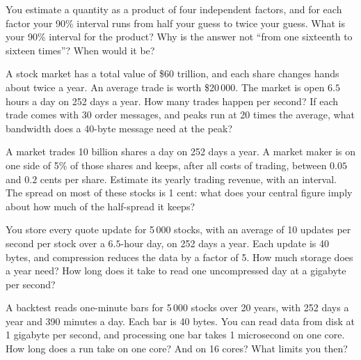 \begin{question}\label{iq:iv1:estimation:12}
You estimate a quantity as a product of four independent factors, and for each factor your 90\% interval runs from half your guess to twice your guess. What is your 90\% interval for the product? Why is the answer not ``from one sixteenth to sixteen times''? When would it be?
\end{question}

\begin{question}\label{iq:iv1:estimation:13}
A stock market has a total value of \$60 trillion, and each share changes hands about twice a year. An average trade is worth \$20\,000. The market is open $6.5$ hours a day on 252 days a year. How many trades happen per second? If each trade comes with 30 order messages, and peaks run at 20 times the average, what bandwidth does a 40-byte message need at the peak?
\end{question}

\begin{question}\label{iq:iv1:estimation:14}
A market trades 10 billion shares a day on 252 days a year. A market maker is on one side of 5\% of those shares and keeps, after all costs of trading, between $0.05$ and $0.2$ cents per share. Estimate its yearly trading revenue, with an interval. The spread on most of these stocks is 1 cent: what does your central figure imply about how much of the half-spread it keeps?
\end{question}

\begin{question}\label{iq:iv1:estimation:15}
You store every quote update for 5\,000 stocks, with an average of 10 updates per second per stock over a $6.5$-hour day, on 252 days a year. Each update is 40 bytes, and compression reduces the data by a factor of 5. How much storage does a year need? How long does it take to read one uncompressed day at a gigabyte per second?
\end{question}

\begin{question}\label{iq:iv1:estimation:16}
A backtest reads one-minute bars for 5\,000 stocks over 20 years, with 252 days a year and 390 minutes a day. Each bar is 40 bytes. You can read data from disk at 1 gigabyte per second, and processing one bar takes 1 microsecond on one core. How long does a run take on one core? And on 16 cores? What limits you then?
\end{question}

